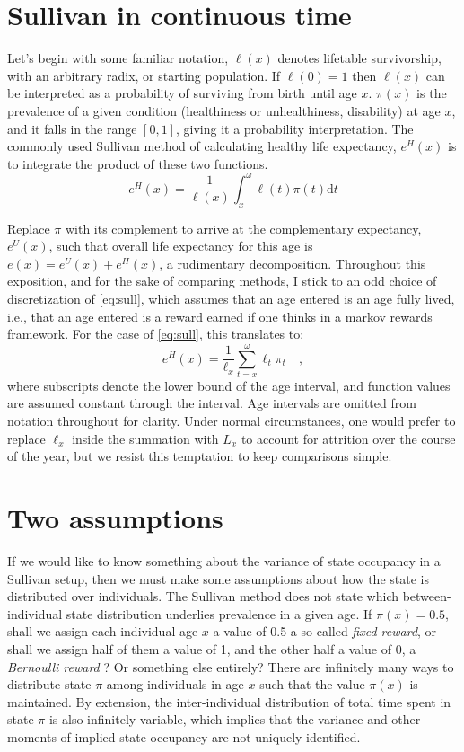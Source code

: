 \documentclass[a4paper]{article}
\begin{document}
\section*{Sullivan in continuous time}
Let's begin with some familiar notation, $\ell(x)$ denotes lifetable survivorship, with an arbitrary radix, or starting population. If $\ell(0) = 1$ then $\ell(x)$ can be interpreted as a probability of surviving from birth until age $x$. $\pi(x)$ is the prevalence of a given condition (healthiness or unhealthiness, disability) at age $x$, and it falls in the range $[0,1]$, giving it a probability interpretation. The commonly used Sullivan method \citep{sullivan1971single} of calculating healthy life expectancy, $e^H(x)$ is to integrate the product of these two functions.
%
\begin{equation}
\label{eq:sull}
e^H(x) = \frac{1}{\ell(x)} \int_x^\omega \ell(t)\pi(t) \mathrm{d}t
\end{equation}
%

Replace $\pi$ with its complement to arrive at the complementary expectancy, $e^U(x)$, such that overall life expectancy for this age is $e(x) = e^U(x) + e^H(x)$, a rudimentary decomposition. Throughout this exposition, and for the sake of comparing methods, I stick to an odd choice of discretization of \ref{eq:sull}, which assumes that an age entered is an age fully lived, i.e., that an age entered is a reward earned if one thinks in a markov rewards framework. For the case of \eqref{eq:sull}, this translates to:
\begin{equation}
\label{eq:sulldisc}
e^H(x) = \frac{1}{\ell_x} \sum_{t=x}^\omega \ell_t\pi_t \quad \mathrm{,}
\end{equation}
where subscripts denote the lower bound of the age interval, and function values are assumed constant through the interval. Age intervals are omitted from notation throughout for clarity. Under normal circumstances, one would prefer to replace $\ell_x$ inside the summation with $L_x$ to account for attrition over the course of the year, but we resist this temptation to keep comparisons simple.

\section*{Two assumptions}
If we would like to know something about the variance of state occupancy in a Sullivan setup, then we must make some assumptions about how the state is distributed over individuals. The Sullivan method does not state which between-individual state distribution underlies prevalence in a given age. If $\pi(x) = 0.5$, shall we assign each individual age $x$ a value of 0.5 a so-called \emph{fixed reward}, or shall we assign half of them a value of 1, and the other half a value of 0, a \emph{Bernoulli reward} \citep{caswell2018matrix}? Or something else entirely? There are infinitely many ways to distribute state $\pi$ among individuals in age $x$ such that the value $\pi(x)$ is maintained. By extension, the inter-individual distribution of total time spent in state $\pi$ is also infinitely variable, which implies that the variance and other moments of implied state occupancy are not uniquely identified. 
\end{document}
